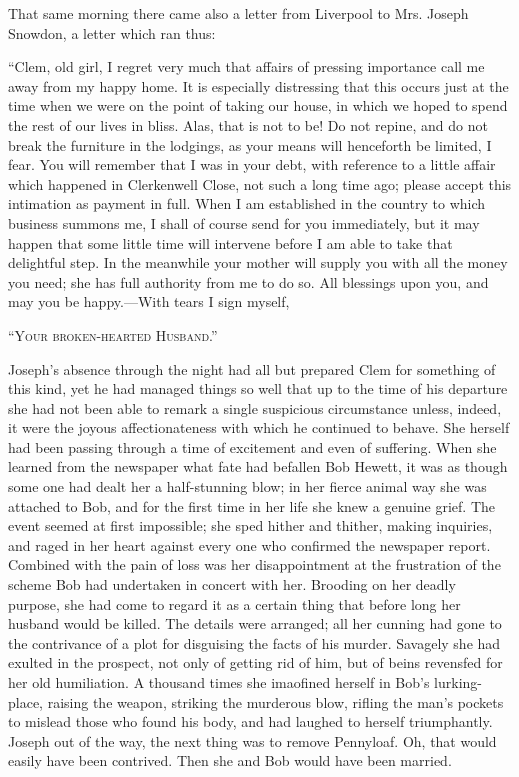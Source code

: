 That same morning there came also a letter from Liverpool to Mrs. Joseph
Snowdon, a letter which ran thus:

``Clem, old girl, I regret very much that affairs of pressing importance
call me away from my happy home. It is especially distressing that this
occurs just at the time when we {\protect\hypertarget{238}{}{}}were on
the point of taking our house, in which we hoped to spend the rest of
our lives in bliss. Alas, that is not to be! Do not repine, and do not
break the furniture in the lodgings, as your means will henceforth be
limited, I fear. You will remember that I was in your debt, with
reference to a little affair which happened in Clerkenwell Close, not
such a long time ago; please accept this intimation as payment in full.
When I am established in the country to which business summons me, I
shall of course send for you immediately, but it may happen that some
little time will intervene before I am able to take that delightful
step. In the meanwhile your mother will supply you with all the money
you need; she has full authority from me to do so. All blessings upon
you, and may you be happy.---With tears I sign myself,

\textsc{``Your broken-hearted Husband.''}{﻿}

Joseph's absence through the night had all but prepared Clem for
something of this kind, yet he had managed things so well that up to the
time of his departure she had not been able to remark a single
suspicious circumstance {\protect\hypertarget{239}{}{}}unless, indeed,
it were the joyous affectionateness with which he continued to behave.
She herself had been passing through a time of excitement and even of
suffering. When she learned from the newspaper what fate had befallen
Bob Hewett, it was as though some one had dealt her a half-stunning
blow; in her fierce animal way she was attached to Bob, and for the
first time in her life she knew a genuine grief. The event seemed at
first impossible; she sped hither and thither, making inquiries, and
raged in her heart against every one who confirmed the newspaper report.
Combined with the pain of loss was her disappointment at the frustration
of the scheme Bob had undertaken in concert with her. Brooding on her
deadly purpose, she had come to regard it as a certain thing that before
long her husband would be killed. The details were arranged; all her
cunning had gone to the contrivance of a plot for disguising the facts
of his murder. Savagely she had exulted in the prospect, not only of
getting rid of him, but of beins revensfed for her old humiliation. A
thousand times she imaofined herself in Bob's lurking-place, raising the
weapon, {\protect\hypertarget{240}{}{}}striking the murderous blow,
rifling the man's pockets to mislead those who found his body, and had
laughed to herself triumphantly. Joseph out of the way, the next thing
was to remove Pennyloaf. Oh, that would easily have been contrived. Then
she and Bob would have been married.

